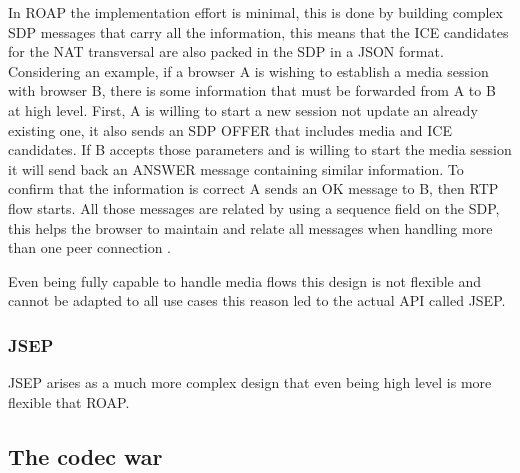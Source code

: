In ROAP the implementation effort is minimal, this is done by building complex SDP messages that carry all the information, this means that the ICE candidates for the NAT transversal are also packed in the SDP in a JSON format. Considering an example, if a browser A is wishing to establish a media session with browser B, there is some information that must be forwarded from A to B at high level. First, A is willing to start a new session not update an already existing one, it also sends an SDP OFFER that includes media and ICE candidates. If B accepts those parameters and is willing to start the media session it will send back an ANSWER message containing similar information. To confirm that the information is correct A sends an OK message to B, then RTP flow starts. All those messages are related by using a sequence field on the SDP, this helps the browser to maintain and relate all messages when handling more than one peer connection \cite{roapIETF}.

Even being fully capable to handle media flows this design is not flexible and cannot be adapted to all use cases this reason led to the actual API called JSEP.

\subsubsection{JSEP}
JSEP arises as a much more complex design that even being high level is more flexible that ROAP. 

\subsection{The codec war}

